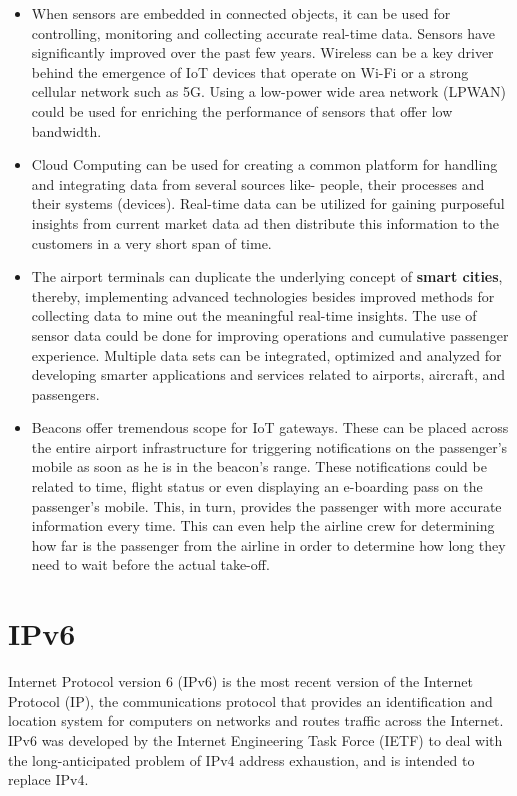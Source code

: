 \documentclass[a4paper,12pt]{article}
\begin{document}
\begin{itemize}
\item{ When sensors are embedded in connected objects, it can be used for controlling, monitoring and collecting accurate real-time data. Sensors have significantly improved over the past few years. Wireless can be a key driver behind the emergence of IoT devices that operate on Wi-Fi or a strong cellular network such as 5G. Using a low-power wide area network (LPWAN) could be used for enriching the performance of sensors that offer low bandwidth.}
\item{ Cloud Computing can be used for creating a common platform for handling and integrating data from several sources like- people, their processes and their systems (devices). Real-time data can be utilized for gaining purposeful insights from current market data ad then distribute this information to the customers in a very short span of time.}
\item{ The airport terminals can duplicate the underlying concept of \textbf{smart cities}, thereby, implementing advanced technologies besides improved methods for collecting data to mine out the meaningful real-time insights. The use of sensor data could be done for improving operations and cumulative passenger experience. Multiple data sets can be integrated, optimized and analyzed for developing smarter applications and services related to airports, aircraft, and passengers.}
\item{ Beacons offer tremendous scope for IoT gateways. These can be placed across the entire airport infrastructure for triggering notifications on the passenger’s mobile as soon as he is in the beacon’s range. These notifications could be related to time, flight status or even displaying an e-boarding pass on the passenger’s mobile. This, in turn, provides the passenger with more accurate information every time. This can even help the airline crew for determining how far is the passenger from the airline in order to determine how long they need to wait before the actual take-off.}
\end{itemize}

\section{IPv6}

Internet Protocol version 6 (IPv6) is the most recent version of the Internet Protocol (IP), the communications protocol that provides an identification and location system for computers on networks and routes traffic across the Internet. IPv6 was developed by the Internet Engineering Task Force (IETF) to deal with the long-anticipated problem of IPv4 address exhaustion, and is intended to replace IPv4\footnotemark{}.
\end{document}
